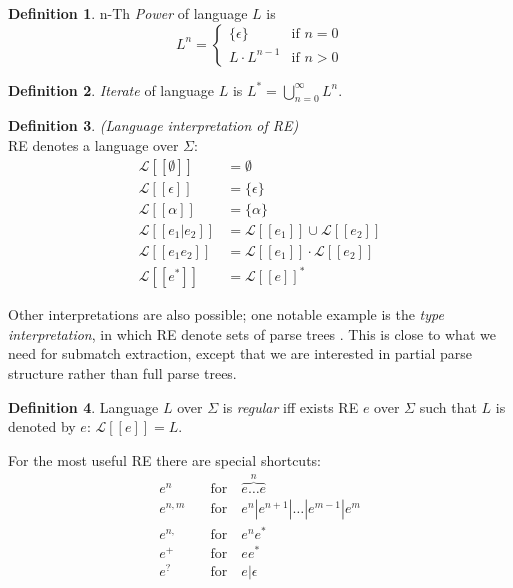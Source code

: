 \documentclass{article}
\newcommand{\Xeq}{\!=\!}
\newcommand{\Xlb}{[\![}
\newcommand{\Xrb}{]\!]}
\newcommand{\XL}{\mathcal{L}}
\theoremstyle{definition}
\newtheorem{Xdef}{Definition}
\begin{document}
\begin{multicols}{2}
    \begin{Xdef}\label{langiterate}
    n-Th \emph{Power} of language $L$ is
    $$L^n = \begin{cases}
            \{ \epsilon \} & \text{if } n \Xeq 0 \\[-0.5em]
            L \cdot L^{n - 1} & \text{if } n\!>\!0
        \end{cases}$$
    \end{Xdef}

    \begin{Xdef}\label{langiterate}
    \emph{Iterate} of language $L$ is
    $L^* = \bigcup\limits_{n = 0}^\infty L^n$.
    \end{Xdef}

    \begin{Xdef}
    \emph{(Language interpretation of RE)} \\
    RE denotes a language over $\Sigma$:
    \begin{align*}
        \XL \Xlb \emptyset \Xrb &= \emptyset \\
        \XL \Xlb \epsilon \Xrb &= \{ \epsilon \} \\
        \XL \Xlb \alpha \Xrb &= \{\alpha\} \\
        \XL \Xlb e_1 | e_2 \Xrb &= \XL \Xlb e_1 \Xrb \cup \XL \Xlb e_2 \Xrb \\
        \XL \Xlb e_1 e_2 \Xrb &= \XL \Xlb e_1 \Xrb \cdot \XL \Xlb e_2 \Xrb \\
        \XL \Xlb e^* \Xrb &= \XL \Xlb e \Xrb ^*
    \end{align*}
    \end{Xdef}

Other interpretations are also possible;
one notable example is the \emph{type interpretation},
in which RE denote sets of parse trees \cite{BT10} \cite{Gra15}.
This is close to what we need for submatch extraction,
except that we are interested in partial parse structure rather than full parse trees.

    \begin{Xdef}
    Language $L$ over $\Sigma$ is \emph{regular} iff exists RE $e$ over $\Sigma$
    such that $L$ is denoted by $e$: $\XL \Xlb e \Xrb \Xeq L$.
    \end{Xdef}

For the most useful RE there are special shortcuts:
    \begin{align*}
        e^n     &\quad\text{for}\quad \overbrace{e \dots e}^{n} \\[-0.5em]
        e^{n,m} &\quad\text{for}\quad e^n | e^{n+1} | \dots | e^{m-1} | e^m \\[-0.5em]
        e^{n,}  &\quad\text{for}\quad e^n e^* \\[-0.5em]
        e^+     &\quad\text{for}\quad ee^* \\[-0.5em]
        e^?     &\quad\text{for}\quad e | \epsilon
    \end{align*}


\end{multicols}
\end{document}
